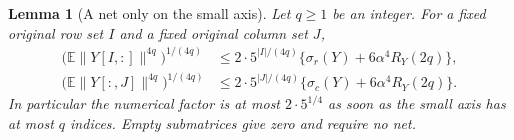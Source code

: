 \documentclass[11pt]{article}
\newtheorem{lemma}[theorem]{Lemma}
\theoremstyle{definition}
\theoremstyle{remark}
\newcommand{\E}{\mathbb E}
\newcommand{\norm}[1]{\lVert#1\rVert}
\begin{document}
\begin{lemma}[A net only on the small axis]
\label{mi32-thin-lemma}
Let $q\ge1$ be an integer. For a fixed original row set $I$ and a fixed
original column set $J$,
\begin{align}
 \bigl(\E\norm{Y[I,:]}^{4q}\bigr)^{1/(4q)}
 &\le2\cdot5^{|I|/(4q)}
        \bigl\{\sigma_r(Y)+6\alpha^4R_Y(2q)\bigr\},
                     \label{mi32-thin-rows}\\
 \bigl(\E\norm{Y[:,J]}^{4q}\bigr)^{1/(4q)}
 &\le2\cdot5^{|J|/(4q)}
        \bigl\{\sigma_c(Y)+6\alpha^4R_Y(2q)\bigr\}.
                     \label{mi32-thin-columns}
\end{align}
In particular the numerical factor is at most $2\cdot5^{1/4}$ as soon as
the small axis has at most $q$ indices. Empty submatrices give zero and
require no net.
\end{lemma}
\end{document}
